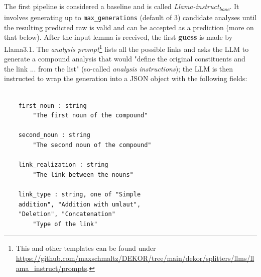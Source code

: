 \documentclass[11pt]{article}
\begin{document}
The first pipeline is considered a baseline and is called \textit{Llama-instruct\textsubscript{base}}. It involves generating up to \texttt{max\_generations} (default of 3) candidate analyses until the resulting predicted raw is valid and can be accepted as a prediction (more on that below). After the input lemma is received, the first \textbf{guess} is made by Llama3.1. The \textit{analysis prompt}\footnote{This and other templates can be found under \url{https://github.com/maxschmaltz/DEKOR/tree/main/dekor/splitters/llms/llama_instruct/prompts}.} lists all the possible links and asks the LLM to generate a compound analysis that would "define the original constituents and the link ... from the list" (so-called \textit{analysis instructions}); the LLM is then instructed to wrap the generation into a JSON object with the following fields:

\begin{verbatim}

	first_noun : string
		"The first noun of the compound"

	second_noun : string
		"The second noun of the compound"

	link_realization : string
		"The link between the nouns"

	link_type : string, one of "Simple
    addition", "Addition with umlaut",
    "Deletion", "Concatenation"
		"Type of the link"

\end{verbatim}
\end{document}
